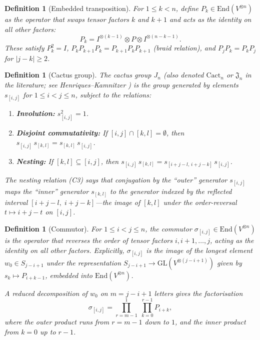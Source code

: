 \documentclass[11pt]{article}
\newtheorem{definition}[theorem]{Definition}
\theoremstyle{remark}
\begin{document}
\begin{definition}[Embedded transposition]\label{def:embed}
For $1 \leq k < n$, define $P_k \in \mathrm{End}(V^{\otimes n})$ as the
operator that swaps tensor factors $k$ and $k+1$ and acts as the identity
on all other factors:
\[
  P_k = I^{\otimes(k-1)} \otimes P \otimes I^{\otimes(n-k-1)}.
\]
These satisfy $P_k^2 = I$, $P_k P_{k+1} P_k = P_{k+1} P_k P_{k+1}$
(braid relation), and $P_j P_k = P_k P_j$ for $|j - k| \geq 2$.
\end{definition}

\begin{definition}[Cactus group]\label{def:cactus}
The \emph{cactus group} $J_n$ (also denoted $\mathrm{Cact}_n$ or
$\mathfrak{J}_n$ in the literature; see Henriques--Kamnitzer
\cite{henriques-kamnitzer}) is the group generated by elements
$s_{[i,j]}$ for $1 \leq i < j \leq n$, subject to the relations:
\begin{enumerate}
  \item[\textbf{(C1)}] \textbf{Involution:}
    $s_{[i,j]}^2 = 1$.
  \item[\textbf{(C2)}] \textbf{Disjoint commutativity:}
    If $[i,j] \cap [k,l] = \emptyset$, then
    $s_{[i,j]}\, s_{[k,l]} = s_{[k,l]}\, s_{[i,j]}$.
  \item[\textbf{(C3)}] \textbf{Nesting:}
    If $[k,l] \subseteq [i,j]$, then
    $s_{[i,j]}\, s_{[k,l]} = s_{[i+j-l,\, i+j-k]}\, s_{[i,j]}$.
\end{enumerate}
The nesting relation (C3) says that conjugation by the ``outer'' generator
$s_{[i,j]}$ maps the ``inner'' generator $s_{[k,l]}$ to the generator
indexed by the \emph{reflected} interval $[i+j-l,\; i+j-k]$---the image
of $[k,l]$ under the order-reversal $t \mapsto i + j - t$ on $[i,j]$.
\end{definition}

\begin{definition}[Commutor]\label{def:commutor}
For $1 \leq i < j \leq n$, the \emph{commutor}
$\sigma_{[i,j]} \in \mathrm{End}(V^{\otimes n})$
is the operator that reverses the order of tensor factors $i, i+1, \ldots, j$,
acting as the identity on all other factors. Explicitly, $\sigma_{[i,j]}$
is the image of the longest element $w_0 \in S_{j-i+1}$ under the
representation $S_{j-i+1} \to \mathrm{GL}(V^{\otimes(j-i+1)})$ given by
$s_k \mapsto P_{i+k-1}$, embedded into $\mathrm{End}(V^{\otimes n})$.

A reduced decomposition of $w_0$ on $m = j - i + 1$ letters gives the
factorisation
\begin{equation}\label{eq:w0}
  \sigma_{[i,j]} = \prod_{r=m-1}^{1}\;\prod_{k=0}^{r-1} P_{i+k},
\end{equation}
where the outer product runs from $r = m-1$ down to $1$, and the inner
product from $k = 0$ up to $r - 1$.
\end{definition}
\end{document}
